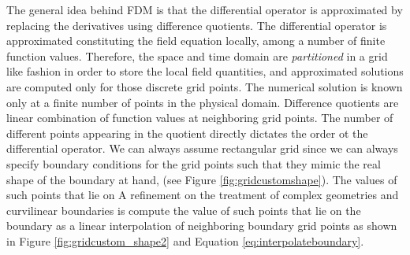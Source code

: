 The general idea behind FDM is that the differential operator is approximated by replacing the derivatives using difference quotients. The differential operator is approximated constituting the field equation locally, among a number of finite function values. Therefore, the space and time domain are \textit{partitioned} in a grid like fashion in order to store the local field quantities, and approximated solutions are computed only for those discrete grid points. The numerical solution is known only at a finite number of points in the physical domain. 
Difference quotients are linear combination of function values at neighboring grid points. The number of different points appearing in the quotient directly dictates the order ot the differential operator.
We can always assume rectangular grid since we can always  specify boundary conditions for the grid points such that they mimic the real shape of the boundary at hand, (see Figure \ref{fig:gridcustomshape}).
The values of such points that lie on
A refinement on the treatment of complex geometries and curvilinear boundaries is compute the value of such points that lie on the boundary as a linear interpolation of neighboring boundary grid points as shown in Figure \ref{fig:gridcustom_shape2} and Equation \ref{eq:interpolateboundary}.

